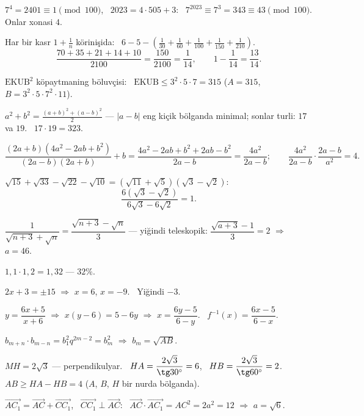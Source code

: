 




$7^4=2401\equiv1\pmod{100}$, \ $2023=4\cdot505+3$: \ $7^{2023}\equiv7^3=343\equiv43\pmod{100}$. Onlar xonasi $4$.

Har bir kasr $1+\frac1n$ körinişida: \ $6-5-\left(\frac1{30}+\frac1{60}+\frac1{100}+\frac1{150}+\frac1{210}\right)$.
\[\frac{70+35+21+14+10}{2100}=\frac{150}{2100}=\frac1{14},\qquad 1-\frac1{14}=\frac{13}{14}.\]

$\text{EKUB}^2$ köpaytmaning böluvçisi: \ $\text{EKUB}\le3^2\cdot5\cdot7=315$ ($A=315$, $B=3^2\cdot5\cdot7^2\cdot11$).

$a^2+b^2=\frac{(a+b)^2+(a-b)^2}2$ — $|a-b|$ eng kiçik bölganda minimal; sonlar turli: $17$ va $19$. \ $17\cdot19=323$.

\[\frac{(2a+b)\left(4a^2-2ab+b^2\right)}{(2a-b)(2a+b)}+b=\frac{4a^2-2ab+b^2+2ab-b^2}{2a-b}=\frac{4a^2}{2a-b};\qquad \frac{4a^2}{2a-b}\cdot\frac{2a-b}{a^2}=4.\]

$\sqrt{15}+\sqrt{33}-\sqrt{22}-\sqrt{10}=\left(\sqrt{11}+\sqrt5\right)\left(\sqrt3-\sqrt2\right)$:
\[\frac{6\left(\sqrt3-\sqrt2\right)}{6\sqrt3-6\sqrt2}=1.\]

$\dfrac1{\sqrt{n+3}+\sqrt n}=\dfrac{\sqrt{n+3}-\sqrt n}3$ — yiğindi teleskopik: $\dfrac{\sqrt{a+3}-1}3=2$ $\Rightarrow$ $a=46$.

$1{,}1\cdot1{,}2=1{,}32$ — $32\%$.

$2x+3=\pm15$ $\Rightarrow$ $x=6$, $x=-9$. \ Yiğindi $-3$.

$y=\dfrac{6x+5}{x+6}$ $\Rightarrow$ $x(y-6)=5-6y$ $\Rightarrow$ $x=\dfrac{6y-5}{6-y}$. \ $f^{-1}(x)=\dfrac{6x-5}{6-x}$.

$b_{m+n}\cdot b_{m-n}=b_1^2q^{2m-2}=b_m^2$ $\Rightarrow$ $b_m=\sqrt{AB}$.

$MH=2\sqrt3$ — perpendikulyar. \ $HA=\dfrac{2\sqrt3}{\tg30^\circ}=6$, \ $HB=\dfrac{2\sqrt3}{\tg60^\circ}=2$.\\
$AB\ge HA-HB=4$ ($A$, $B$, $H$ bir nurda bölganda).

$\overrightarrow{AC_1}=\overrightarrow{AC}+\overrightarrow{CC_1}$, \ $\overrightarrow{CC_1}\perp\overrightarrow{AC}$: \ $\overrightarrow{AC}\cdot\overrightarrow{AC_1}=AC^2=2a^2=12$ $\Rightarrow$ $a=\sqrt6$.

